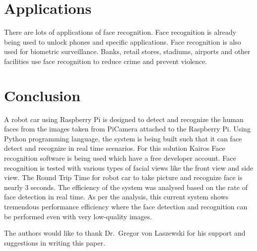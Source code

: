 \section{Applications}
There are lots of applications of face recognition. Face recognition is 
already being used to unlock phones and specific applications. Face 
recognition is also used for biometric surveillance. Banks, retail stores, 
stadiums, airports and other facilities use face recognition to reduce 
crime and prevent violence.

\section{Conclusion}
A robot car using Raspberry Pi is designed to detect and recognize the 
human faces from the images taken from PiCamera attached to the 
Raspberry Pi. Using Python programming language, the system is being built 
such that it can face detect and recognize in real time scenarios. For 
this solution Kairos Face recognition software is being used which have 
a free developer account. Face recognition is tested with various types 
of facial views like the front view and side view. The Round Trip Time 
for robot car to take picture and recognize face is nearly 3 seconds. 
The efficiency of the system was analysed based on the rate of face 
detection in real time. As per the analysis, this current system shows 
tremendous performance efficiency where the face detection and recognition 
can be performed even with very low-quality images.


\begin{acks}

The authors would like to thank Dr.\ Gregor von Laszewski for his support 
and suggestions in writing this paper.

\end{acks}



